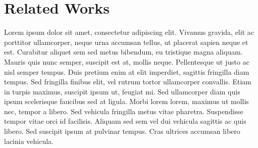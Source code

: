 \section{Related Works}
Lorem ipsum dolor sit amet, consectetur adipiscing elit. Vivamus gravida, elit ac porttitor ullamcorper, neque urna accumsan tellus, ut placerat sapien neque et est. Curabitur aliquet sem sed metus bibendum, eu tristique magna aliquam. Mauris quis nunc semper, suscipit est at, mollis neque. Pellentesque ut justo ac nisl semper tempus. Duis pretium enim at elit imperdiet, sagittis fringilla diam tempus. Sed fringilla finibus elit, vel rutrum tortor ullamcorper convallis. Etiam in turpis maximus, suscipit ipsum ut, feugiat mi. Sed ullamcorper diam quis ipsum scelerisque faucibus sed at ligula. Morbi lorem lorem, maximus ut mollis nec, tempor a libero. Sed vehicula fringilla metus vitae pharetra. Suspendisse tempor vitae orci id facilisis. Aliquam sed sem vel dui vehicula sagittis ac quis libero. Sed suscipit ipsum at pulvinar tempus. Cras ultrices accumsan libero lacinia vehicula.
